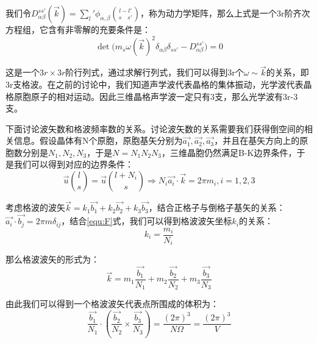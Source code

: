 \documentclass{ctexart}
\begin{document}
                我们令$D_{\alpha\beta}^{ss'}(\vec{k})=\sum_l'\phi_{\alpha,\beta}\binom{l-l'}{s\quad s'}$，称为动力学矩阵，那么上式是一个3r阶齐次方程组，它含有非零解的充要条件是：
                \begin{equation}
                    \det{\Big(m_s\omega(\vec{k})^2\delta_{\alpha\beta}\delta_{ss'}-D_{\alpha\beta}^{ss'}\Big)}=0
                \end{equation}
                
                这是一个$3r\times 3r$阶行列式，通过求解行列式，我们可以得到3r个$\omega\sim \vec{k}$的关系，即3r支格波。在之前的讨论中，我们知道声学波代表晶格的集体振动，光学波代表晶格原胞原子的相对运动。因此三维晶格声学波一定只有3支，那么光学波有3r-3支。
                
                下面讨论波矢数和格波频率数的关系。讨论波矢数的关系需要我们获得倒空间的相关信息。假设晶体有N个原胞，原胞基矢分别为$\vec{a_1},\vec{a_2},\vec{a_3}$，并且在基矢方向上的原胞数分别是$N_1,N_2,N_3$，于是$N=N_1N_2N_3$，三维晶胞仍然满足B-K边界条件，于是我们可以得到对应的边界条件：
                \begin{equation}\label{equ:F}
                    \vec{u}\binom{l}{s}=\vec{u}\binom{l+N_i}{s}\Rightarrow N_i\vec{a_i}\cdot\vec{k}=2\pi m_i,i=1,2,3
                \end{equation}
                
                考虑格波的波矢$\vec{k}=k_1\vec{b_1}+k_2\vec{b_2}+k_3\vec{b_3}$，结合正格子与倒格子基矢的关系：$\vec{a_i}\cdot\vec{b_j}=2\pi m\delta_{ij}$，结合\eqref{equ:F}式，我们可以得到格波波矢坐标$k_i$的关系：
                \begin{equation}
                    k_i=\frac{m_i}{N_i}
                \end{equation}
                
                那么格波波矢的形式为：
                \begin{equation}
                    \vec{k}=m_1\frac{\vec{b_1}}{N_1}+m_2\frac{\vec{b_2}}{N_2}+m_3\frac{\vec{b_3}}{N_3}
                \end{equation}
                
                由此我们可以得到一个格波波矢代表点所围成的体积为：
                \begin{equation}
                    \frac{\vec{b_1}}{N_1}\cdot(\frac{\vec{b_2}}{N_2}\times\frac{\vec{b_3}}{N_3})=\frac{(2\pi)^3}{N\Omega}=\frac{(2\pi)^3}{V}
                \end{equation}
                
\end{document}
